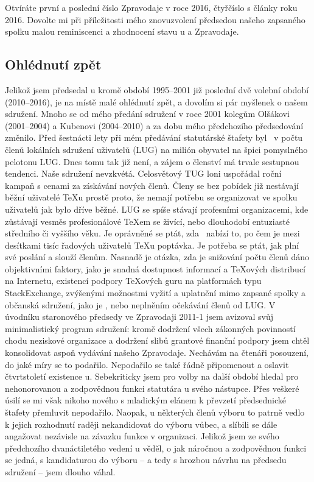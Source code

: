 Otvíráte první a poslední číslo Zpravodaje v roce 2016, čtyřčíslo s články roku 2016. Dovolte mi při příležitosti mého znovuzvolení předsedou našeho zapsaného spolku malou reminiscenci a zhodnocení stavu \CSTUG\unskip u a Zpravodaje.
\subsection*{Ohlédnutí zpět}
Jelikož jsem předsedal \CSTUG u kromě období 1995--2001 již poslední dvě volební období (2010--2016), je na místě malé ohlédnutí zpět, a dovolím si pár myšlenek o našem sdružení.  Mnoho se od mého předání sdružení v roce 2001 kolegům Olšákovi (2001--2004) a Kubenovi (2004--2010) a za dobu mého předchozího předsedování změnilo.
Před šestnácti lety při mém předávání statutárské štafety byl \CSTUG\ v počtu členů lokálních sdružení uživatelů (LUG) na milión obyvatel na špici pomyslného pelotonu LUG. Dnes tomu tak již není, a zájem o členství má trvale sestupnou tendenci. Naše sdružení nevzkvétá.  Celosvětový TUG loni uspořádal roční kampaň s cenami za získávání nových členů. Členy se bez pobídek již nestávají běžní uživatelé \TeX u prostě proto, že nemají potřebu se organizovat ve spolku uživatelů jak bylo dříve běžné.  LUG se spíše stávají profesními organizacemi, kde zůstávají vesměs profesionálové \TeX em se živící, nebo dlouhodobí entuziasté středního či vyššího věku.
Je oprávněné se ptát, zda \CSTUG\ nabízí to, po čem je mezi desítkami tisíc řadových uživatelů \TeX u poptávka.  Je potřeba se ptát, jak plní své poslání a slouží členům.  Nasnadě je otázka, zda je snižování počtu členů dáno objektivními faktory, jako je snadná dostupnost informací a \TeX ových distribucí na Internetu, existencí podpory \TeX ových guru na platformách typu StackExchange, zvýšenými možnostmi vyžití a uplatnění mimo zapsané spolky a občanská sdružení, jako je \CSTUG, nebo neplněním očekávání členů od LUG.
V úvodníku staronového předsedy ve Zpravodaji 2011-1 jsem avizoval svůj minimalistický program sdružení: kromě dodržení všech zákonných povinností chodu neziskové organizace a dodržení slibů grantové finanční podpory jsem chtěl konsolidovat aspoň vydávání našeho Zpravodaje.  Nechávám na čtenáři posouzení, do jaké míry se to podařilo.  Nepodařilo se také řádně připomenout a oslavit čtvrtstoletí existence \CSTUG u.
Sebekriticky jsem pro volby na další období hledal pro nehonorovanou a zodpovědnou funkci statutára \CSTUG u svého nástupce. Přes veškeré úsilí se mi však nikoho nového s mladickým elánem k převzetí předsednické štafety přemluvit nepodařilo.  Naopak, u některých členů výboru to patrně vedlo k jejich rozhodnutí raději nekandidovat do výboru vůbec, a slíbili se dále angažovat nezávisle na závazku funkce v organizaci. Jelikož jsem ze svého předchozího dvanáctiletého vedení \CSTUG u věděl, o jak náročnou a zodpovědnou funkci se jedná, s kandidaturou do výboru -- a tedy s hrozbou návrhu na předsedu sdružení -- jsem dlouho váhal.
